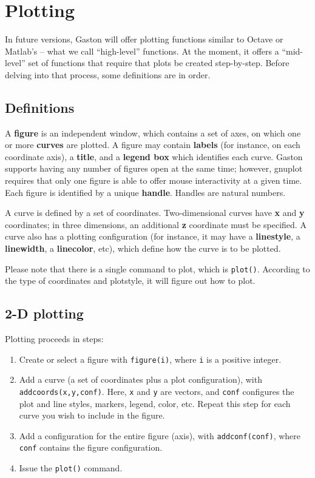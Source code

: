 \documentclass[11pt]{article}
\newcommand{\cmd}[1]{\texttt{#1}}
\begin{document}
\section{Plotting}

In future versions, Gaston will offer plotting functions similar to Octave or
Matlab's -- what we call ``high-level'' functions. At the moment, it offers a
``mid-level'' set of functions that require that plots be created step-by-step.
Before delving into that process, some definitions are in order.

\subsection{Definitions}

A \textbf{figure} is an independent window, which contains a set of axes, on
which one or more \textbf{curves} are plotted. A figure may contain
\textbf{labels} (for instance, on each coordinate axis), a \textbf{title}, and a
\textbf{legend box} which identifies each curve. Gaston supports having any
number of figures open at the same time; however, gnuplot requires that only
one figure is able to offer mouse interactivity at a given time. Each figure is
identified by a unique \textbf{handle}. Handles are natural numbers.

A curve is defined by a set of coordinates. Two-dimensional curves have
\textbf{x} and \textbf{y} coordinates; in three dimensions, an additional
\textbf{z} coordinate must be specified. A curve also has a plotting
configuration (for instance, it may have a \textbf{linestyle}, a
\textbf{linewidth}, a \textbf{linecolor}, etc), which define how the curve
is to be plotted.

Please note that there is a single command to plot, which is \cmd{plot()}.
According to the type of coordinates and plotstyle, it will figure out how to
plot.

\subsection{2-D plotting}

Plotting proceeds in steps:
\begin{enumerate}
	\item Create or select a figure with \cmd{figure(i)}, where \cmd{i} is a
		positive integer.
	\item Add a curve (a set of coordinates plus a plot configuration), with
		\cmd{addcoords(x,y,conf)}. Here, \cmd{x} and \cmd{y} are vectors, and
		\cmd{conf} configures the plot and line styles, markers, legend, color,
		etc. Repeat this step for each curve you wish to include
		in the figure.
	\item Add a configuration for the entire figure (axis), with
		\cmd{addconf(conf)}, where \cmd{conf} contains the figure
		configuration.
	\item Issue the \cmd{plot()} command.
\end{enumerate}
\end{document}
